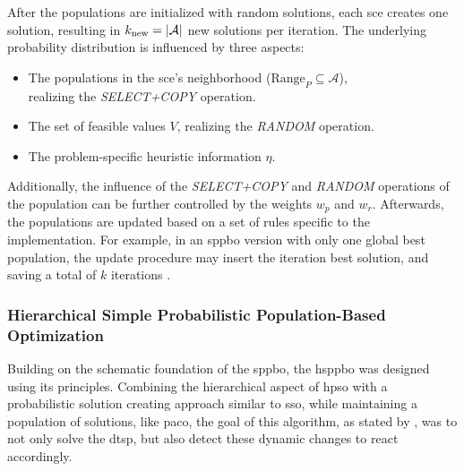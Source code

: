 After the populations are initialized with random solutions, each \gls{sce} creates one solution, resulting in $k_{\text{new}} = \left\lvert\mathcal{A}\right\rvert$ new solutions per iteration. The underlying probability distribution is influenced by three aspects:
\begin{itemize}
	\item The populations in the \gls{sce}'s neighborhood ($\text{Range}_P \subseteq \mathcal{A}$),\\realizing the \textit{SELECT+COPY} operation.
	\item The set of feasible values $V$, realizing the \textit{RANDOM} operation.
	\item The problem-specific heuristic information $\eta$.
\end{itemize}
Additionally, the influence of the \textit{SELECT+COPY} and \textit{RANDOM} operations of the population can be further controlled by the weights $w_p$ and $w_r$. Afterwards, the populations are updated based on a set of rules specific to the implementation. For example, in an \gls{sppbo} version with only one global best population, the update procedure may insert the iteration best solution, and saving a total of $k$ iterations \cite{lin2015simple}.

\subsubsection{Hierarchical Simple Probabilistic Population-Based Optimization}
\label{chap:hsppbo}

Building on the schematic foundation of the \gls{sppbo}, the \gls{hsppbo} was designed using its principles. Combining the hierarchical aspect of \gls{hpso} with a probabilistic solution creating approach similar to \gls{sso}, while maintaining a population of solutions, like \gls{paco}, the goal of this algorithm, as stated by \citet{kupfer2021hierarchical}, was to not only solve the \gls{dtsp}, but also detect these dynamic changes to react accordingly. 

